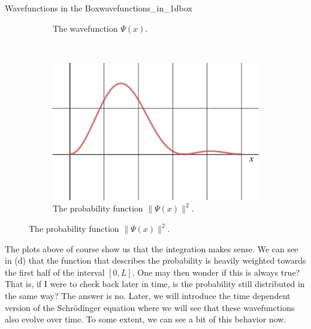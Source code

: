 \begin{ex}{Wavefunctions in the Box}{wavefunctions_in_1dbox}
\begin{figure}[H]
\begin{subfigure}[h]{0.49\textwidth}
			\caption{The wavefunction $\Psi(x)$.}
		\end{subfigure}
		~
		\begin{subfigure}[h]{0.49\textwidth}
			\centering
			\includegraphics[width=.8\textwidth]{Figures_Part_5/prob_Psi.png}
			\caption{The probability function $\|\Psi(x)\|^2$.}
		\end{subfigure}
	\end{figure}
	The plots above of course show us that the integration makes sense.  We can see in (d) that the function that describes the probability is heavily weighted towards the first half of the interval $[0,L]$. One may then wonder if this is always true? That is, if I were to check back later in time, is the probability still distributed in the same way? The answer is no.  Later, we will introduce the time dependent version of the Schr\"odinger equation where we will see that these wavefunctions also evolve over time.  To some extent, we can see a bit of this behavior now.
	

\end{ex}
